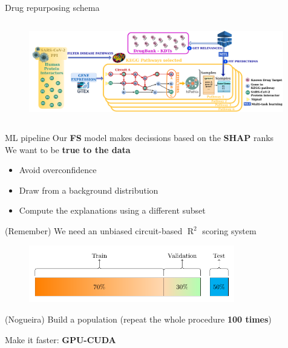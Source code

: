 \documentclass[compress,ignorenonframetext,aspectratio=1610,handout]{beamer}
\DeclareMathOperator{\rtwo}{R}
\begin{document}
\begin{frame}{Drug repurposing schema}
	\begin{columns}
		\begin{figure}
			\includegraphics[width=0.99\textwidth]{figs/methods/COVI-19_drugRepo.png}
		\end{figure}

	\end{columns}
\end{frame}

\begin{frame}{ML pipeline}
		Our \textbf{FS} model makes decissions based on the \textbf{SHAP} ranks\\

		We want to be \textbf{true to the data}
		\begin{itemize}
			\item Avoid overconfidence
			\item Draw from a background distribution
			\item Compute the explanations using a different subset
		\end{itemize}
		(Remember) We need an unbiased circuit-based $\rtwo^2$ scoring system

		\begin{figure}
		\centering\includegraphics[width=0.8\textwidth]{figs/methods/val.pdf}
		\end{figure}

		(Nogueira) Build a population (repeat the whole procedure \textbf{100 times})

		Make it faster: \textbf{GPU-CUDA}
\end{frame}
\end{document}
